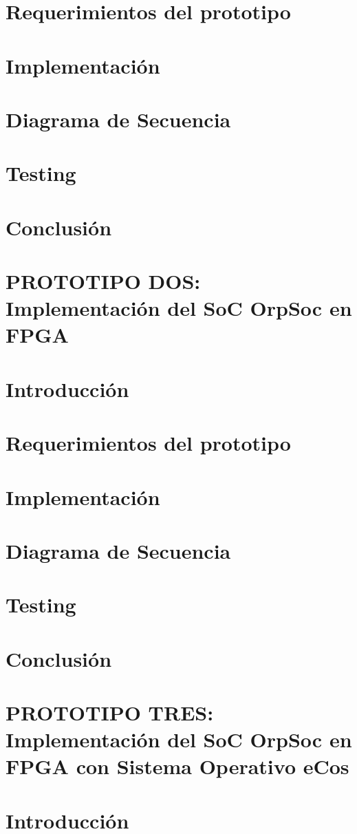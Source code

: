 		\section{Requerimientos del prototipo}
		\section{Implementación}
		\section{Diagrama de Secuencia}
		\section{Testing}
		\section{Conclusión}
	\section{PROTOTIPO DOS: Implementación del SoC OrpSoc en FPGA}
		\section{Introducción}
		\section{Requerimientos del prototipo}
		\section{Implementación}
		\section{Diagrama de Secuencia}
		\section{Testing}
		\section{Conclusión}
	\section{PROTOTIPO TRES: Implementación del SoC OrpSoc en FPGA con Sistema Operativo eCos}
		\section{Introducción}
